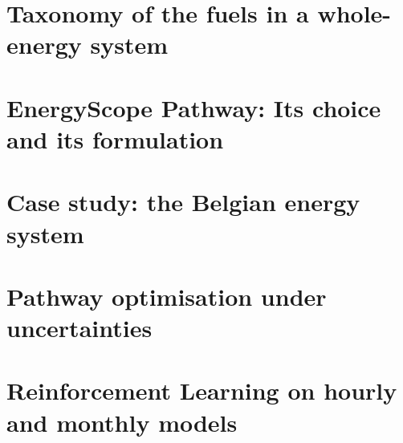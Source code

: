 \documentclass[a4paper,twoside,10pt,final]{memoir} %
\begin{document}

\clearemptydoublepage
{\footnotesize}
\thispagestyle{empty}

\clearemptydoublepage






\begin{appendices}
%
\chapter{Taxonomy of the fuels in a whole-energy system}
\label{app:Taxonomy}
\thispagestyle{empty}


\chapter{EnergyScope Pathway: Its choice and its formulation}
\label{app:EnergyScope}
\thispagestyle{empty}


\chapter{Case study: the Belgian energy system}
\label{app:case_study}
\thispagestyle{empty}


\chapter{Pathway optimisation under uncertainties}
\label{app:results_UQ}
\thispagestyle{empty}



\chapter{Reinforcement Learning on hourly and monthly models}
\label{app:app_RL_TD_MO}
\thispagestyle{empty}



\end{appendices}
\end{document}
